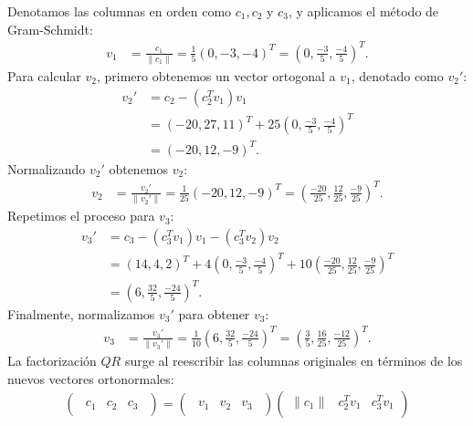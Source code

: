 \begin{homeworkProblem}
\begin{itemize}
\begin{solucion}
Denotamos las columnas en orden como $c_1, c_2$ y $c_3$, y aplicamos el método de Gram-Schmidt:  
\begin{align*}
    v_1 &= \frac{c_1}{\|c_1\|} = \frac{1}{5} (0, -3, -4)^T = \left( 0, \frac{-3}{5}, \frac{-4}{5} \right)^T.
\end{align*}
Para calcular $v_2$, primero obtenemos un vector ortogonal a $v_1$, denotado como $v_2'$:
\begin{align*}
    v_2' &= c_2 - (c_2^T v_1) v_1 \\
         &= (-20, 27, 11)^T + 25 \left( 0, \frac{-3}{5}, \frac{-4}{5} \right)^T \\
         &= (-20, 12, -9)^T.
\end{align*}
Normalizando $v_2'$ obtenemos $v_2$:
\begin{align*}
    v_2 &= \frac{v_2'}{\|v_2'\|} = \frac{1}{25} (-20, 12, -9)^T = \left( \frac{-20}{25}, \frac{12}{25}, \frac{-9}{25} \right)^T.
\end{align*}
Repetimos el proceso para $v_3$:
\begin{align*}
    v_3' &= c_3 - (c_3^T v_1) v_1 - (c_3^T v_2) v_2 \\
         &= (14, 4, 2)^T + 4 \left( 0, \frac{-3}{5}, \frac{-4}{5} \right)^T + 10 \left( \frac{-20}{25}, \frac{12}{25}, \frac{-9}{25} \right)^T \\
         &= \left(6, \frac{32}{5}, \frac{-24}{5}\right)^T.
\end{align*}
Finalmente, normalizamos $v_3'$ para obtener $v_3$:
\begin{align*}
    v_3 &= \frac{v_3'}{\|v_3'\|} = \frac{1}{10} \left(6, \frac{32}{5}, \frac{-24}{5}\right)^T = \left(\frac{3}{5}, \frac{16}{25}, \frac{-12}{25}\right)^T.
\end{align*}
La factorización $QR$ surge al reescribir las columnas originales en términos de los nuevos vectores ortonormales:
\begin{align*}
    \begin{pmatrix}
        \begin{array}{c|c|c}
            c_1 & c_2 & c_3
        \end{array}
    \end{pmatrix} =
    \begin{pmatrix}
        \begin{array}{c|c|c}
            v_1 & v_2 & v_3
        \end{array}
    \end{pmatrix}
    \begin{pmatrix}
        \|c_1\| & c_2^T v_1 & c_3^T v_1 \\

\end{pmatrix}
\end{align*}
\end{solucion}
\end{itemize}
\end{homeworkProblem}
